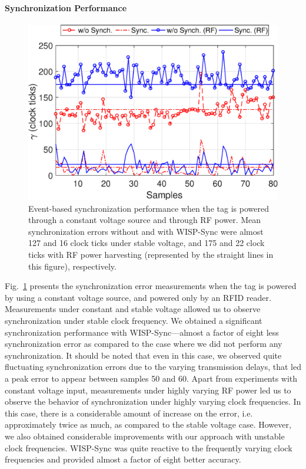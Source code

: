\documentclass[journal,draftcls,onecolumn,12pt,twoside]{IEEEtranTCOM}
\begin{document}
\paragraph{Synchronization Performance}

\begin{figure}
\centering
\includegraphics[scale=0.35]{figures/synchronization_accuracy.eps}
\caption{\label{fig:sync_error}Event-based synchronization performance when the tag is powered through a constant voltage source and through RF power. Mean synchronization errors without and with WISP-Sync were almost 127 and 16 clock ticks under stable voltage, and 175 and 22 clock ticks with RF power harvesting (represented by the straight lines in this figure), respectively.}
\end{figure}

Fig.~\ref{fig:sync_error} presents the synchronization error measurements when the tag is powered by using a constant voltage source, and powered only by an RFID reader. Measurements under constant and stable voltage allowed us to observe synchronization under stable clock frequency. We obtained a significant synchronization performance with WISP-Sync---almost a factor of eight less synchronization error as compared to the case where we did not perform any synchronization. It should be noted that even in this case, we observed quite fluctuating synchronization errors due to the varying transmission delays, that led a peak error to appear between samples 50 and 60. Apart from experiments with constant voltage input, measurements under highly varying RF power led us to observe the behavior of synchronization under highly varying clock frequencies. In this case, there is a considerable amount of increase on the error, i.e. approximately twice as much, as compared to the stable voltage case. However, we also obtained considerable improvements with our approach with unstable clock frequencies. WISP-Sync was quite reactive to the frequently varying clock frequencies and provided almost a factor of eight better accuracy.
\end{document}
